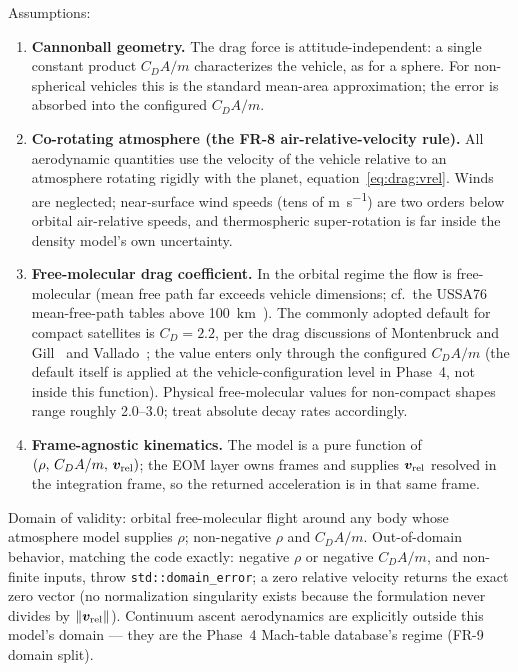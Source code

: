 Assumptions:
\begin{enumerate}
  \item \textbf{Cannonball geometry.} The drag force is
    attitude-independent: a single constant product $C_D A / m$
    characterizes the vehicle, as for a sphere. For non-spherical
    vehicles this is the standard mean-area approximation; the error is
    absorbed into the configured $C_D A / m$.
  \item \textbf{Co-rotating atmosphere (the FR-8 air-relative-velocity
    rule).} All aerodynamic quantities use the velocity of the vehicle
    relative to an atmosphere rotating rigidly with the planet,
    equation~\eqref{eq:drag:vrel}. Winds are neglected; near-surface wind
    speeds (tens of \unit{\metre\per\second}) are two orders below
    orbital air-relative speeds, and thermospheric super-rotation is far
    inside the density model's own uncertainty.
  \item \textbf{Free-molecular drag coefficient.} In the orbital regime
    the flow is free-molecular (mean free path far exceeds vehicle
    dimensions; cf.\ the USSA76 mean-free-path tables above
    \qty{100}{\kilo\metre}~\cite{ussa1976}). The commonly adopted default
    for compact satellites is $C_D = 2.2$, per the drag discussions of
    Montenbruck and Gill~\cite[Sect.~3.5]{montenbruck2000} and
    Vallado~\cite[Sect.~8.6.2]{vallado2013}; the value enters only
    through the configured $C_D A / m$ (the default itself is applied at
    the vehicle-configuration level in Phase~4, not inside this
    function). Physical free-molecular values for non-compact shapes
    range roughly 2.0--3.0; treat absolute decay rates accordingly.
  \item \textbf{Frame-agnostic kinematics.} The model is a pure function
    of $(\rho,\, C_D A/m,\, \bm{v}_{\mathrm{rel}})$; the EOM layer owns
    frames and supplies $\bm{v}_{\mathrm{rel}}$ resolved in the
    integration frame, so the returned acceleration is in that same
    frame.
\end{enumerate}

Domain of validity: orbital free-molecular flight around any body whose
atmosphere model supplies $\rho$; non-negative $\rho$ and $C_D A / m$.
Out-of-domain behavior, matching the code exactly: negative $\rho$ or
negative $C_D A / m$, and non-finite inputs, throw
\texttt{std::domain\_error}; a zero relative velocity returns the exact
zero vector (no normalization singularity exists because the formulation
never divides by $\lVert \bm{v}_{\mathrm{rel}} \rVert$). Continuum ascent
aerodynamics are explicitly outside this model's domain --- they are the
Phase~4 Mach-table database's regime (FR-9 domain split).

